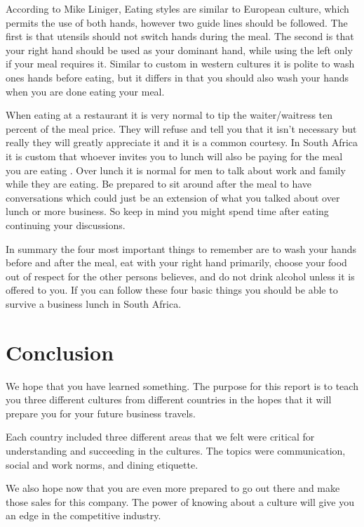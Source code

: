 \documentclass[11pt,a4paper,twoside]{report}
\begin{document}
According to Mike Liniger, Eating styles are similar to European culture, which
permits the use of both hands, however two guide lines should be followed. The
first is that utensils should not switch hands during the meal.  The second is
that your right hand should be used as your dominant hand, while using the left
only if your meal requires it. Similar to custom in western cultures it is
polite to wash ones hands before eating, but it differs in that you should also
wash your hands when you are done eating your meal.

When eating at a restaurant it is very normal to tip the waiter/waitress ten
percent of the meal price. They will refuse and tell you that it isn’t
necessary but really they will greatly appreciate it and it is a common
courtesy. In South Africa it is custom that whoever invites you to lunch will
also be paying for the meal you are eating \citep*{lininger}. Over lunch it is
normal for men to talk about work and family while they are eating. Be prepared
to sit around after the meal to have conversations which could just be an
extension of what you talked about over lunch or more business. So keep in mind
you might spend time after eating continuing your discussions.

In summary the four most important things to remember are to wash your hands
before and after the meal, eat with your right hand primarily, choose your food
out of respect for the other persons believes, and do not drink alcohol unless
it is offered to you. If you can follow these four basic things you should be
able to survive a business lunch in South Africa.

\chapter{Conclusion}

We hope that you have learned something. The purpose for this report is to
teach you three different cultures from different countries in the hopes that
it will prepare you for your future business travels.

Each country included three different areas that we felt were critical for
understanding and succeeding in the cultures. The topics were communication,
social and work norms, and dining etiquette.

We also hope now that you are even more prepared to go out there and make
those sales for this company. The power of knowing about a culture will
give you an edge in the competitive industry.
\end{document}

